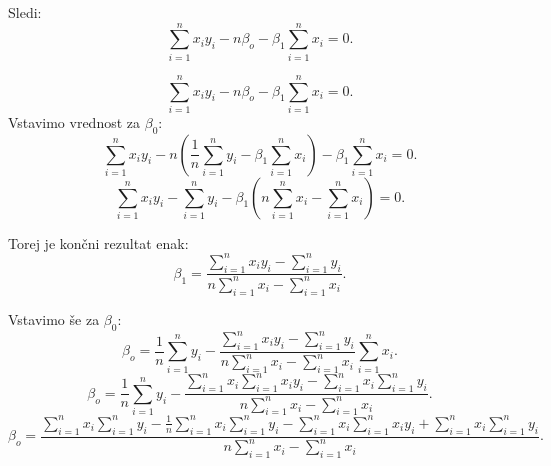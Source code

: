 \documentclass{article}
\begin{document}
Sledi:
\begin{equation*}
\sum_{i=1}^nx_iy_i-n\beta_o-\beta_1\sum_{i=1}^nx_i = 0.
\end{equation*}

\begin{equation*}
\sum_{i=1}^nx_iy_i-n\beta_o-\beta_1\sum_{i=1}^nx_i = 0.
\end{equation*}
Vstavimo vrednost za $\beta_0$:
\begin{equation*}
\sum_{i=1}^nx_iy_i-n\left(\frac{1}{n} \sum_{i=1}^n y_i - \beta_1\sum_{i=1}^nx_i\right)-\beta_1\sum_{i=1}^nx_i = 0.
\end{equation*}
\begin{equation*}
\sum_{i=1}^nx_iy_i- \sum_{i=1}^n y_i - \beta_1\left(n\sum_{i=1}^nx_i-\sum_{i=1}^nx_i\right) = 0.
\end{equation*}


Torej je končni rezultat enak:
\begin{equation*}
\beta_1 = \frac{\sum_{i=1}^nx_iy_i- \sum_{i=1}^n y_i}{n\sum_{i=1}^nx_i-\sum_{i=1}^nx_i}.
\end{equation*}

Vstavimo še za $\beta_0$:
\begin{equation*}
\beta_o = \frac{1}{n} \sum_{i=1}^n y_i -  \frac{\sum_{i=1}^nx_iy_i- \sum_{i=1}^n y_i}{n\sum_{i=1}^nx_i-\sum_{i=1}^nx_i}\sum_{i=1}^nx_i.
\end{equation*}
\begin{equation*}
\beta_o = \frac{1}{n} \sum_{i=1}^n y_i -  \frac{\sum_{i=1}^nx_i\sum_{i=1}^nx_iy_i- \sum_{i=1}^nx_i\sum_{i=1}^n y_i}{n\sum_{i=1}^nx_i-\sum_{i=1}^nx_i}.
\end{equation*}
\begin{equation*}
\beta_o = \frac{\sum_{i=1}^nx_i\sum_{i=1}^ny_i - \frac{1}{n}\sum_{i=1}^nx_i\sum_{i=1}^ny_i    -\sum_{i=1}^nx_i\sum_{i=1}^nx_iy_i+ \sum_{i=1}^nx_i\sum_{i=1}^n y_i}{n\sum_{i=1}^nx_i-\sum_{i=1}^nx_i}.
\end{equation*}
\end{document}
